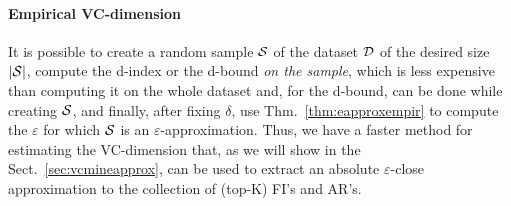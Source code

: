 \paragraph{Empirical VC-dimension} 
It is possible to create a random sample ${\cal S}$ of the dataset
${\cal D}$ of the desired size $|{\cal S}|$, compute the d-index or the d-bound \emph{on
the sample}, which is less expensive than computing it on the
whole dataset and, for the d-bound, can be done while creating ${\cal S}$, and
finally, after fixing $\delta$, use Thm.~\ref{thm:eapproxempir} to compute the
$\varepsilon$ for which ${\cal S}$ is an $\varepsilon$-approximation. Thus, 
we have a faster method for estimating the VC-dimension that, 
as we will show in the Sect.~\ref{sec:vcmineapprox}, can be used to extract an absolute
$\varepsilon$-close approximation to the collection of (top-K) FI's and AR's.

